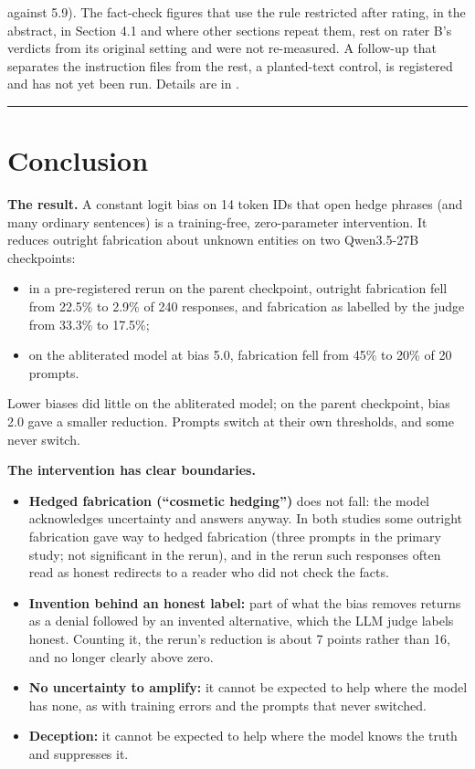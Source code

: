 \documentclass[11pt,letterpaper]{article}
\providecommand{\tightlist}{\setlength{\itemsep}{0pt}\setlength{\parskip}{0pt}}
\DeclareRobustCommand{\_}{\textunderscore\allowbreak}
\begin{document}
\begin{itemize}
against 5.9). The fact-check figures that use the rule restricted after rating, in the abstract, in Section 4.1 and where other sections repeat them, rest on rater B's verdicts from its original setting and were not re-measured. A follow-up that separates the instruction files from the rest, a planted-text control, is registered and has not yet been run. Details are in .
\end{itemize}

\begin{center}\rule{0.5\linewidth}{0.5pt}\end{center}

\hypertarget{conclusion}{%
\section{Conclusion}\label{conclusion}}

\textbf{The result.} A constant logit bias on 14 token IDs that open hedge phrases (and many ordinary sentences) is a training-free, zero-parameter intervention. It reduces outright fabrication about unknown entities on two Qwen3.5-27B checkpoints:

\begin{itemize}
\tightlist
\item
  in a pre-registered rerun on the parent checkpoint, outright fabrication fell from 22.5\% to 2.9\% of 240 responses, and fabrication as labelled by the judge from 33.3\% to 17.5\%;
\item
  on the abliterated model at bias 5.0, fabrication fell from 45\% to 20\% of 20 prompts.
\end{itemize}

Lower biases did little on the abliterated model; on the parent checkpoint, bias 2.0 gave a smaller reduction. Prompts switch at their own thresholds, and some never switch.

\textbf{The intervention has clear boundaries.}

\begin{itemize}
\tightlist
\item
  \textbf{Hedged fabrication (``cosmetic hedging'')} does not fall: the model acknowledges uncertainty and answers anyway. In both studies some outright fabrication gave way to hedged fabrication (three prompts in the primary study; not significant in the rerun), and in the rerun such responses often read as honest redirects to a reader who did not check the facts.
\item
  \textbf{Invention behind an honest label:} part of what the bias removes returns as a denial followed by an invented alternative, which the LLM judge labels honest. Counting it, the rerun's reduction is about 7 points rather than 16, and no longer clearly above zero.
\item
  \textbf{No uncertainty to amplify:} it cannot be expected to help where the model has none, as with training errors and the prompts that never switched.
\item
  \textbf{Deception:} it cannot be expected to help where the model knows the truth and suppresses it.
\end{itemize}
\end{document}
